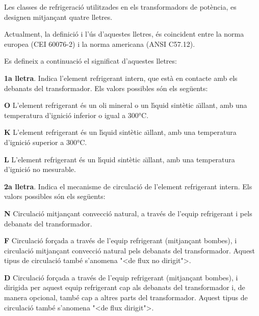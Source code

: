 Les classes de refrigeraci\'{o} utilitzades en els transformadors de
pot\`{e}ncia, es designen mitjan\c{c}ant quatre lletres.

Actualment, la definici\'{o} i l'\'{u}s d'aquestes lletres, \'{e}s coincident
entre la norma europea (\textsf{CEI 60076-2}) i la norma americana
(\textsf{ANSI C57.12}).

Es defineix a continuaci\'{o} el significat d'aquestes lletres:

\textbf{1a lletra}. Indica l'element refrigerant intern, que est\`{a} en
contacte amb els debanats del transformador. Els valors possibles
s\'{o}n els seg\"{u}ents:
\begin{list}{}
   {\setlength{\labelwidth}{4.5mm} \setlength{\leftmargin}{4.5mm} \setlength{\labelsep}{2mm}}
   \item[\textbf{O}] L'element refrigerant \'{e}s un oli mineral o un l\'{\i}quid sint\`{e}tic a\"{\i}llant, amb una temperatura d'ignici\'{o}
   inferior o igual a 300\unit{\celsius}.
   \item[\textbf{K}] L'element refrigerant \'{e}s un l\'{\i}quid sint\`{e}tic a\"{\i}llant, amb una temperatura d'ignici\'{o}
   superior a 300\unit{\celsius}.
   \item[\textbf{L}] L'element refrigerant \'{e}s un l\'{\i}quid sint\`{e}tic a\"{\i}llant, amb una temperatura d'ignici\'{o}
   no mesurable.
\end{list}
  

\textbf{2a lletra}. Indica el mecanisme de circulaci\'{o} de l'element
refrigerant intern. Els valors possibles s\'{o}n els seg\"{u}ents:
\begin{list}{}
   {\setlength{\labelwidth}{4.5mm} \setlength{\leftmargin}{4.5mm} \setlength{\labelsep}{2mm}}
   \item[\textbf{N}] Circulaci\'{o} mitjan\c{c}ant convecci\'{o} natural,
    a trav\'{e}s de l'equip refrigerant i pels debanats del transformador.
   \item[\textbf{F}] Circulaci\'{o} for\c{c}ada a trav\'{e}s de l'equip refrigerant (mitjan\c{c}ant bombes),
    i circulaci\'{o} mitjan\c{c}ant convecci\'{o} natural pels debanats del
    transformador. Aquest tipus de circulaci\'{o} tamb\'{e} s'anomena {"<}de flux no
    dirigit{">}.
   \item[\textbf{D}] Circulaci\'{o} for\c{c}ada a trav\'{e}s de l'equip refrigerant (mitjan\c{c}ant bombes),
    i dirigida per aquest equip refrigerant cap als debanats del
    transformador i, de manera opcional, tamb\'{e} cap a altres parts del transformador. Aquest
    tipus de circulaci\'{o} tamb\'{e} s'anomena {"<}de flux dirigit{">}.
\end{list}
  

